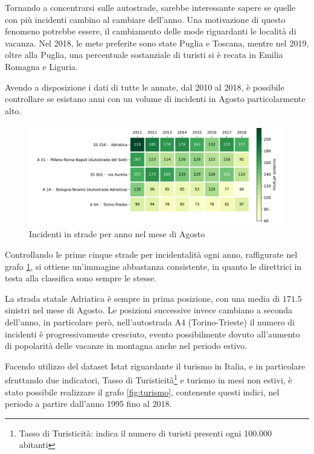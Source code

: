 \documentclass[a4paper,12pt]{report}
\begin{document}
Tornando a concentrarsi sulle autostrade, sarebbe interessante sapere se quelle 
con più incidenti cambino al cambiare dell'anno.
Una motivazione di questo fenomeno potrebbe essere, il cambiamento 
delle mode riguardanti le località di vacanza.
Nel 2018, le mete preferite sono state Puglia e 
Toscana\cite{INFOGRAFICA_ISTAT:1}, mentre nel 2019, oltre alla Puglia, 
una percentuale sostanziale di turisti si è recata in 
Emilia Romagna e Liguria\cite{REPORT_ISTAT_2019:1}.

Avendo a disposizione i dati di tutte le annate, dal 2010 al 2018, 
è possibile controllare se esistano anni con un volume di 
incidenti in Agosto particolarmente alto.

\begin{figure}
    \includegraphics[width=\linewidth]{../src/incidenti/incidenti_aci/agosto/vacanze_autostrade.png}
    \caption{Incidenti in strade per anno nel mese di Agosto}
    \label{fig:autostrade-anno}
\end{figure}

Controllando le prime cinque strade per incidentalità ogni anno, 
raffigurate nel grafo \ref{fig:autostrade-anno}, si ottiene un'immagine 
abbastanza consistente, in quanto le direttrici in testa alla classifica sono 
sempre le stesse.

La strada statale Adriatica è sempre in prima posizione, con una media di $171.5$ 
sinistri nel mese di Agosto.
Le posizioni successive invece cambiano a seconda dell'anno, in particolare però, 
nell'autostrada A4 (Torino-Trieste) il numero di incidenti è progressivamente cresciuto, 
evento possibilmente dovuto all'aumento di popolarità delle vacanze 
in montagna anche nel periodo estivo.

Facendo utilizzo del dataset Istat riguardante il turismo in Italia, e in 
particolare sfruttando due indicatori, Tasso di 
Turisticità\footnote{Tasso di Turisticità: indica il numero di turisti 
presenti ogni 100.000 abitanti\cite{ONTIT:1}} 
e turismo in mesi non estivi, è stato possibile realizzare il grafo \ref{fig:turismo}, 
contenente questi indici, nel periodo a partire dall'anno 1995 fino al 2018.
\end{document}
